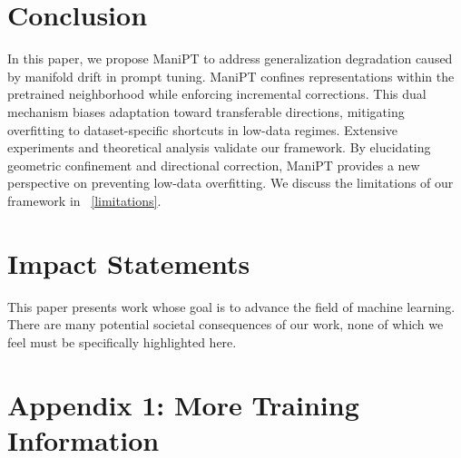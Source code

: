 \documentclass{article}
\theoremstyle{plain}
\theoremstyle{definition}
\theoremstyle{remark}
\begin{document}
	\section{Conclusion}
	In this paper, we propose ManiPT to address generalization degradation caused by manifold drift in prompt tuning. ManiPT confines representations within the pretrained neighborhood while enforcing incremental corrections. This dual mechanism biases adaptation toward transferable directions, mitigating overfitting to dataset-specific shortcuts in low-data regimes. Extensive experiments and theoretical analysis validate our framework. By elucidating geometric confinement and directional correction, ManiPT provides a new perspective on preventing low-data overfitting. We discuss the limitations of our framework in ~\ref{limitations}.
	\section{Impact Statements}
	This paper presents work whose goal is to advance the field of machine learning. There are many potential societal consequences of our work, none of which we feel must be specifically highlighted here.
	
	
	
	\newpage
	\appendix
	\onecolumn
	\section{Appendix 1: More Training Information}
	\label{app:training_info}
\end{document}
